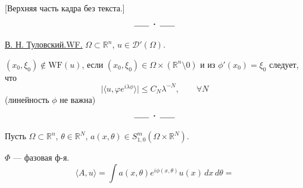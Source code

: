 [Верхняя часть кадра без текста.]
\[
\rule{1.8em}{.4pt}\;\boldsymbol{\cdot}\;\rule{1.8em}{.4pt}
\]
\qquad {}

\underline{\underline{В. Н. Туловский.}}\quad \underline{\underline{WF.}}\quad
\(\Omega\subset\mathbb R^n\), \(u\in\mathcal D'(\Omega)\).

\((x_0,\xi_0)\notin\mathrm{WF}(u)\), если
\((x_0,\xi_0)\in\Omega\times(\mathbb R^n\setminus0)\) и
из \(\phi'(x_0)=\xi_0\) следует, что
\[
\bigl|\langle u,\varphi e^{i\lambda\phi}\rangle\bigr|
\le C_N\lambda^{-N},\qquad\forall N
\]
(линейность \(\phi\) не важна)
\[
\rule{1.8em}{.4pt}\;\boldsymbol{\cdot}\;\rule{1.8em}{.4pt}
\]

Пусть \(\Omega\subset\mathbb R^n\), \(\theta\in\mathbb R^N\),
\(a(x,\theta)\in S^m_{1,0}(\Omega\times\mathbb R^N)\).

\(\Phi\) — фазовая ф-я.
\[
\langle A,u\rangle=\int a(x,\theta)e^{i\phi(x,\theta)}u(x)\,dx\,d\theta=
\]


